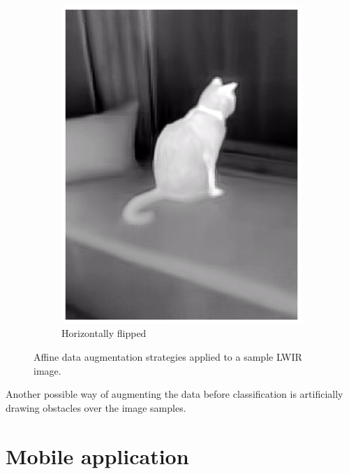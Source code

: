 \documentclass{l4proj}
\begin{document}
\begin{figure}[ht]
\begin{subfigure}[h!]{0.24\textwidth}
    \includegraphics[width=\textwidth]{images/augmentation/flipped.png}
    \caption{Horizontally flipped}
  \end{subfigure}
  \caption{Affine data augmentation strategies applied to a sample LWIR image.}
  \label{fig:augmentation_affine}
\end{figure}

Another possible way of augmenting the data before classification is artificially drawing obstacles over the image samples. 



\section{Mobile application}



\end{document}
